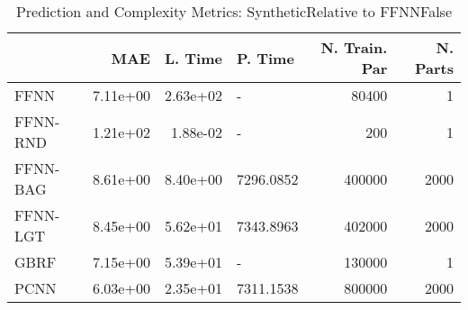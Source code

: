 \begin{table}
\centering
\caption{Prediction and Complexity Metrics: SyntheticRelative to FFNNFalse}
\label{tab__Synthetic__Fix_Neurons_QTrue}
\begin{tabular}{lrrlrr}
\toprule
{} &      MAE &  L. Time &    P. Time &  N. Train. Par &  N. Parts \\
\midrule
FFNN     & 7.11e+00 & 2.63e+02 &          - &          80400 &         1 \\
FFNN-RND & 1.21e+02 & 1.88e-02 &          - &            200 &         1 \\
FFNN-BAG & 8.61e+00 & 8.40e+00 &  7296.0852 &         400000 &      2000 \\
FFNN-LGT & 8.45e+00 & 5.62e+01 &  7343.8963 &         402000 &      2000 \\
GBRF     & 7.15e+00 & 5.39e+01 &          - &         130000 &         1 \\
PCNN     & 6.03e+00 & 2.35e+01 &  7311.1538 &         800000 &      2000 \\
\bottomrule
\end{tabular}
\end{table}
